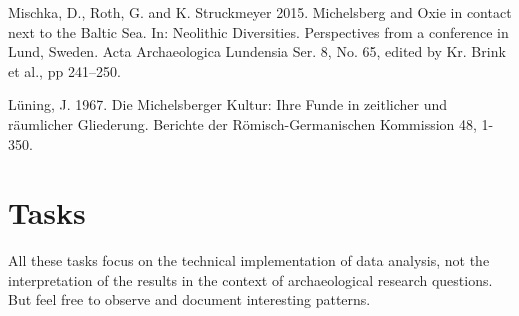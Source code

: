 \documentclass[a3, ruledsections, 8pt]{sciposter}
\begin{document}
Mischka, D., Roth, G. and K. Struckmeyer 2015. Michelsberg and Oxie in contact next to the Baltic Sea. In: Neolithic Diversities. Perspectives from a conference in Lund, Sweden. Acta Archaeologica Lundensia Ser. 8, No. 65, edited by Kr. Brink et al., pp 241–250.

Lüning, J. 1967. Die Michelsberger Kultur: Ihre Funde in zeitlicher und räumlicher Gliederung. Berichte der Römisch-Germanischen Kommission 48, 1-350.


\section{Tasks}

All these tasks focus on the technical implementation of data analysis, not the interpretation of the results in the context of archaeological research questions. But feel free to observe and document interesting patterns.
\end{document}
